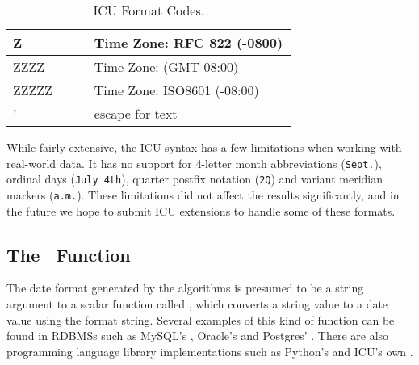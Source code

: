 \begin{table}[ht]
\begin{tabular}{|p{0.2\linewidth}| p{0.5\linewidth}|}
\scriptsize{Z} & \scriptsize{Time Zone: RFC 822 (-0800)}\\ \hline
\scriptsize{ZZZZ} & \scriptsize{Time Zone: (GMT-08:00)}\\ \hline
\scriptsize{ZZZZZ} & \scriptsize{Time Zone: ISO8601 (-08:00)}\\ \hline
    
\scriptsize{'} & \scriptsize{escape for text}\\ \hline

\end{tabular}
\egroup
\caption{ICU Format Codes.}
\label{tab:icuformats}
\end{table}

While fairly extensive, the ICU syntax has a few limitations when working with real-world data. It has no support for 4-letter month abbreviations (\eg \texttt{Sept.}), ordinal days (\eg \texttt{July 4th}), quarter postfix notation (\eg \texttt{2Q}) and variant meridian markers (\eg \texttt{a.m.}). These limitations did not affect the results significantly, and in the future we hope to submit ICU extensions to handle some of these formats. 

\subsection{The \dateparse\ Function}

The date format generated by the algorithms is presumed to be a string argument to a scalar function called \dateparse, which converts a string value to a date value using the format string. Several examples of this kind of function can be found in RDBMSs such as MySQL's , Oracle's  and Postgres' . There are also programming language library implementations such as Python's  and ICU's own .
